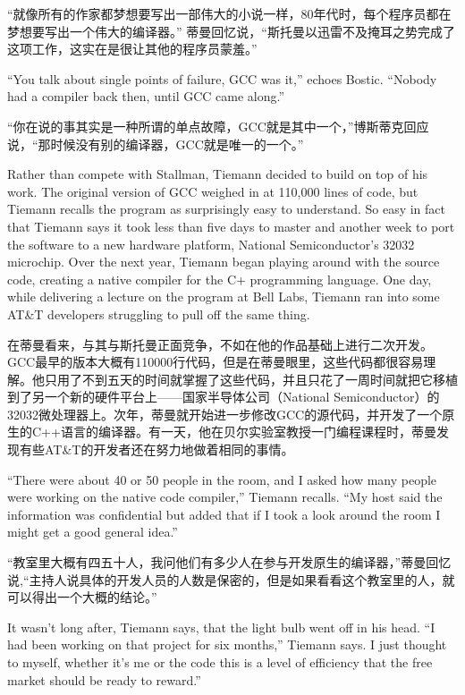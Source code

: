 \ifdefined\chs
``就像所有的作家都梦想要写出一部伟大的小说一样，80年代时，每个程序员都在梦想要写出一个伟大的编译器。'' 蒂曼回忆说，``斯托曼以迅雷不及掩耳之势完成了这项工作，这实在是很让其他的程序员蒙羞。''
\fi

\ifdefined\eng
``You talk about single points of failure, GCC was it,'' echoes Bostic. ``Nobody had a compiler back then, until GCC came along.''
\fi

\ifdefined\chs
``你在说的事其实是一种所谓的单点故障，GCC就是其中一个，''博斯蒂克回应说，``那时候没有别的编译器，GCC就是唯一的一个。''
\fi

\ifdefined\eng
Rather than compete with Stallman, Tiemann decided to build on top of his work. The original version of GCC weighed in at 110,000 lines of code, but Tiemann recalls the program as surprisingly easy to understand. So easy in fact that Tiemann says it took less than five days to master and another week to port the software to a new hardware platform, National Semiconductor's 32032 microchip. Over the next year, Tiemann began playing around with the source code, creating a native compiler for the C+ programming language. One day, while delivering a lecture on the program at Bell Labs, Tiemann ran into some AT\&T developers struggling to pull off the same thing.
\fi

\ifdefined\chs
在蒂曼看来，与其与斯托曼正面竞争，不如在他的作品基础上进行二次开发。GCC最早的版本大概有110000行代码，但是在蒂曼眼里，这些代码都很容易理解。他只用了不到五天的时间就掌握了这些代码，并且只花了一周时间就把它移植到了另一个新的硬件平台上——国家半导体公司（National Semiconductor）的32032微处理器上。次年，蒂曼就开始进一步修改GCC的源代码，并开发了一个原生的C++语言的编译器。有一天，他在贝尔实验室教授一门编程课程时，蒂曼发现有些AT\&T的开发者还在努力地做着相同的事情。
\fi

\ifdefined\eng
``There were about 40 or 50 people in the room, and I asked how many people were working on the native code compiler,'' Tiemann recalls. ``My host said the information was confidential but added that if I took a look around the room I might get a good general idea.''
\fi

\ifdefined\chs
``教室里大概有四五十人，我问他们有多少人在参与开发原生的编译器，''蒂曼回忆说,``主持人说具体的开发人员的人数是保密的，但是如果看看这个教室里的人，就可以得出一个大概的结论。''
\fi

\ifdefined\eng
It wasn't long after, Tiemann says, that the light bulb went off in his head. ``I had been working on that project for six months,'' Tiemann says. I just thought to myself, whether it's me or the code this is a level of efficiency that the free market should be ready to reward.''
\fi

